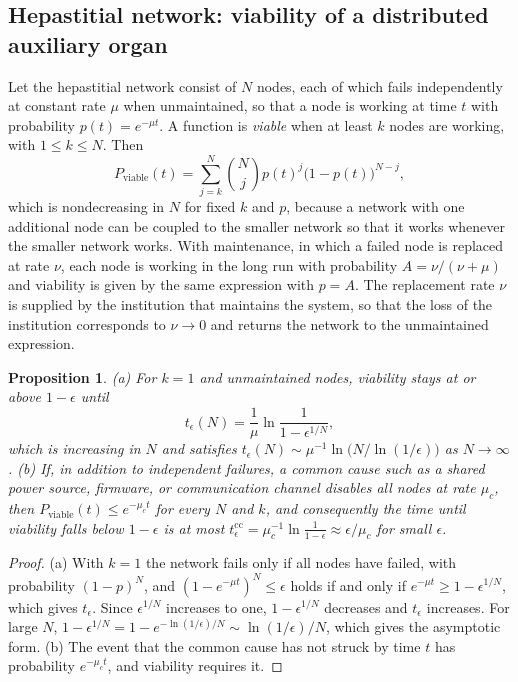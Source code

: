 \documentclass[11pt]{article}
\theoremstyle{plain}
\newtheorem{proposition}{Proposition}
\theoremstyle{definition}
\theoremstyle{remark}
\begin{document}
\subsection{Hepastitial network: viability of a distributed auxiliary organ}

Let the hepastitial network consist of $N$ nodes, each of which fails independently at constant rate $\mu$ when unmaintained, so that a node is working at time $t$ with probability $p(t)=e^{-\mu t}$. A function is \emph{viable} when at least $k$ nodes are working, with $1\le k\le N$. Then
\begin{equation}\label{eq:viable}
P_{\mathrm{viable}}(t)=\sum_{j=k}^{N}\binom Nj p(t)^j\big(1-p(t)\big)^{N-j},
\end{equation}
which is nondecreasing in $N$ for fixed $k$ and $p$, because a network with one additional node can be coupled to the smaller network so that it works whenever the smaller network works. With maintenance, in which a failed node is replaced at rate $\nu$, each node is working in the long run with probability $A=\nu/(\nu+\mu)$ and viability is given by the same expression with $p=A$. The replacement rate $\nu$ is supplied by the institution that maintains the system, so that the loss of the institution corresponds to $\nu\to0$ and returns the network to the unmaintained expression.

\begin{proposition}\label{prop:nodes}
(a) For $k=1$ and unmaintained nodes, viability stays at or above $1-\epsilon$ until
\[
t_\epsilon(N)=\frac1\mu\ln\frac{1}{1-\epsilon^{1/N}},
\]
which is increasing in $N$ and satisfies $t_\epsilon(N)\sim\mu^{-1}\ln\!\big(N/\ln(1/\epsilon)\big)$ as $N\to\infty$. (b) If, in addition to independent failures, a common cause such as a shared power source, firmware, or communication channel disables all nodes at rate $\mu_c$, then $P_{\mathrm{viable}}(t)\le e^{-\mu_c t}$ for every $N$ and $k$, and consequently the time until viability falls below $1-\epsilon$ is at most $t_\epsilon^{\mathrm{cc}}=\mu_c^{-1}\ln\frac1{1-\epsilon}\approx\epsilon/\mu_c$ for small $\epsilon$.
\end{proposition}

\begin{proof}
(a) With $k=1$ the network fails only if all nodes have failed, with probability $(1-p)^N$, and $(1-e^{-\mu t})^N\le\epsilon$ holds if and only if $e^{-\mu t}\ge1-\epsilon^{1/N}$, which gives $t_\epsilon$. Since $\epsilon^{1/N}$ increases to one, $1-\epsilon^{1/N}$ decreases and $t_\epsilon$ increases. For large $N$, $1-\epsilon^{1/N}=1-e^{-\ln(1/\epsilon)/N}\sim\ln(1/\epsilon)/N$, which gives the asymptotic form. (b) The event that the common cause has not struck by time $t$ has probability $e^{-\mu_ct}$, and viability requires it.
\end{proof}
\end{document}

